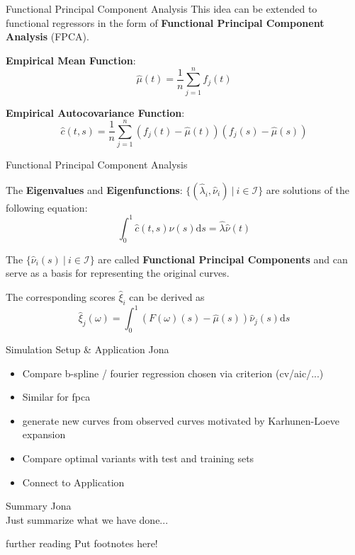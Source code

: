 \documentclass{beamer}
\begin{document}
	\begin{frame}{Functional Principal Component Analysis}
		This idea can be extended to functional regressors in the form of \textbf{Functional Principal Component Analysis} (FPCA).
		\vspace{0.2cm}
		
		\textbf{Empirical Mean Function}:
		$$\hat{\mu}(t) = \frac{1}{n}\sum_{j = 1}^{n}f_j(t)$$

		\textbf{Empirical Autocovariance Function}:
		$$\hat{c}(t,s) = \frac{1}{n} \sum_{j = 1}^{n} \left(f_j(t) - \hat{\mu}(t)\right) \left(f_j(s) - \hat{\mu}(s)\right)$$

	\end{frame}

	\begin{frame}{Functional Principal Component Analysis}
	
		The \textbf{Eigenvalues} and \textbf{Eigenfunctions}: $\{(\hat{\lambda}_i, \hat{\nu}_i) \: \vert \: i \in \mathcal{I}\}$  are solutions of the following equation:
		$$ \int_{0}^{1}\hat{c}(t,s)\hat{\nu}(s) \mathrm{d}s = \hat{\lambda} \hat{\nu}(t) $$
		\vspace{0.2cm}
		
		The $\{\hat{\nu}_i(s) \: \vert \: i \in \mathcal{I}\}$ are called \textbf{Functional Principal Components} and can serve as a basis for representing the original curves. 
		\vspace{0.2cm}
		
		The corresponding scores $\hat{\xi}_i$ can be derived as
		$$\hat{\xi}_j(\omega) = \int_{0}^{1} (F(\omega)(s) - \hat{\mu}(s)) \hat{\nu}_j(s) \mathrm{d}s$$
		
	\end{frame}
	
	\begin{frame}{Simulation Setup \& Application}
		Jona
		\begin{itemize}
			\item Compare b-spline / fourier regression chosen via criterion (cv/aic/...)
			\item Similar for fpca
			\item generate new curves from observed curves motivated by Karhunen-Loeve expansion
			\item Compare optimal variants with test and training sets
			\item Connect to Application
		\end{itemize}
	\end{frame}

	\begin{frame}{Summary}
		Jona \\
		Just summarize what we have done...
	\end{frame}

	\begin{frame}{further reading}
		Put footnotes here!
	\end{frame}
	
\end{document}
